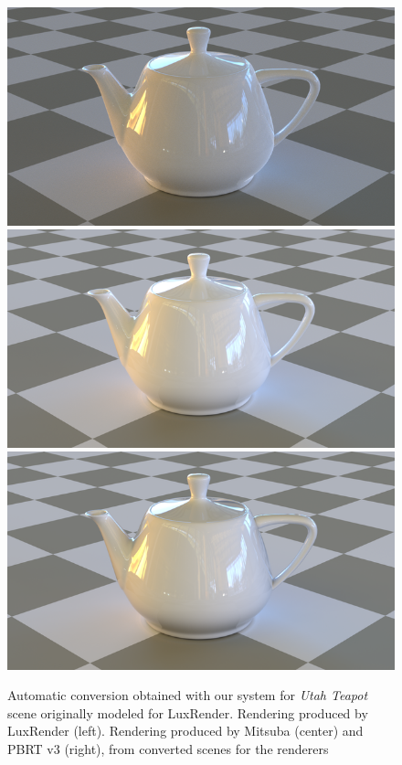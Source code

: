 \begin{figure}
\centering
\includegraphics[width=0.32\linewidth]{figs/4_results/teapot/1_from_lux.png}
\includegraphics[width=0.32\linewidth]{figs/4_results/teapot/2_to_mitsuba.png}
\includegraphics[width=0.32\linewidth]{figs/4_results/teapot/3_to_pbrt.png}
\caption{Automatic conversion obtained with our system for \textit{Utah Teapot}
scene originally modeled for LuxRender. Rendering produced by LuxRender (left).
Rendering produced by Mitsuba (center) and PBRT v3 (right),
from converted scenes for the renderers}
\label{fig:teapot}
\end{figure}

